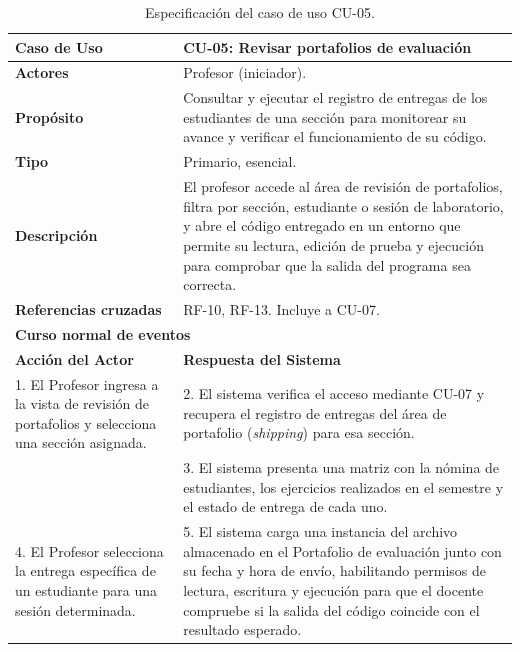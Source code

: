 \begin{table}[H]
\centering
\caption{Especificación del caso de uso CU-05.}
\label{tab:cu_05}
\small
\begin{tabular}{p{} p{}}
\toprule
\textbf{Caso de Uso} & \textbf{CU-05: Revisar portafolios de evaluación} \\
\midrule
\textbf{Actores} & Profesor (iniciador). \\
\textbf{Propósito} & Consultar y ejecutar el registro de entregas de los estudiantes de una sección para monitorear su avance y verificar el funcionamiento de su código. \\
\textbf{Tipo} & Primario, esencial. \\
\textbf{Descripción} & El profesor accede al área de revisión de portafolios, filtra por sección, estudiante o sesión de laboratorio, y abre el código entregado en un entorno que permite su lectura, edición de prueba y ejecución para comprobar que la salida del programa sea correcta. \\
\textbf{Referencias cruzadas} & RF-10, RF-13. Incluye a CU-07. \\
\midrule
\multicolumn{2}{l}{\textbf{Curso normal de eventos}} \\
\midrule
\textbf{Acción del Actor} & \textbf{Respuesta del Sistema} \\
\midrule
1. El Profesor ingresa a la vista de revisión de portafolios y selecciona una sección asignada. & 2. El sistema verifica el acceso mediante CU-07 y recupera el registro de entregas del área de portafolio (\textit{shipping}) para esa sección. \\
 & 3. El sistema presenta una matriz con la nómina de estudiantes, los ejercicios realizados en el semestre y el estado de entrega de cada uno. \\
4. El Profesor selecciona la entrega específica de un estudiante para una sesión determinada. & 5. El sistema carga una instancia del archivo almacenado en el Portafolio de evaluación junto con su fecha y hora de envío, habilitando permisos de lectura, escritura y ejecución para que el docente compruebe si la salida del código coincide con el resultado esperado. \\
\bottomrule
\end{tabular}
\end{table}

